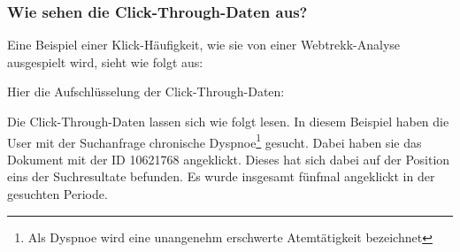 \subsubsection{Wie sehen die Click-Through-Daten aus?}
\label{sec:Grundlagen:Grundbegriffe:Click-Through-Daten:AussehenClick-Through-Daten}

Eine Beispiel einer Klick-Häufigkeit, wie sie von einer Webtrekk-Analyse ausgespielt wird, sieht wie folgt aus:

\begin{table}[H]
\centering
\vspace{-.75em}
\caption[Beispiel Click-Through-Daten]{Beispiel Click-Through-Daten}
\vspace{-.5em}
\label{tab:BeispielCTDaten}
\footnotesize
\renewcommand*{\arraystretch}{1.2}
\vspace{-2em}
\end{table}

Hier die Aufschlüsselung der Click-Through-Daten:

\begin{table}[H]
\centering
\vspace{-.75em}
\caption[Beispielhafte Aufschlüsselung der Click-Through-Daten]{Beispielhafte Aufschlüsselung der Click-Through-Daten}
\label{tab:AufschluesselungCTDaten}
\vspace{-.5em}
\footnotesize
\renewcommand*{\arraystretch}{1.2}
\vspace{-2em}
\end{table}

Die Click-Through-Daten lassen sich wie folgt lesen. In diesem Beispiel haben die User mit der Suchanfrage \glqq chronische Dyspnoe\footnote{Als Dyspnoe wird eine unangenehm erschwerte Atemtätigkeit bezeichnet}\grqq{} gesucht. Dabei haben sie das Dokument mit der ID 10621768 angeklickt. Dieses hat sich dabei auf der Position eins der Suchresultate befunden. Es wurde insgesamt fünfmal angeklickt in der gesuchten Periode. 

